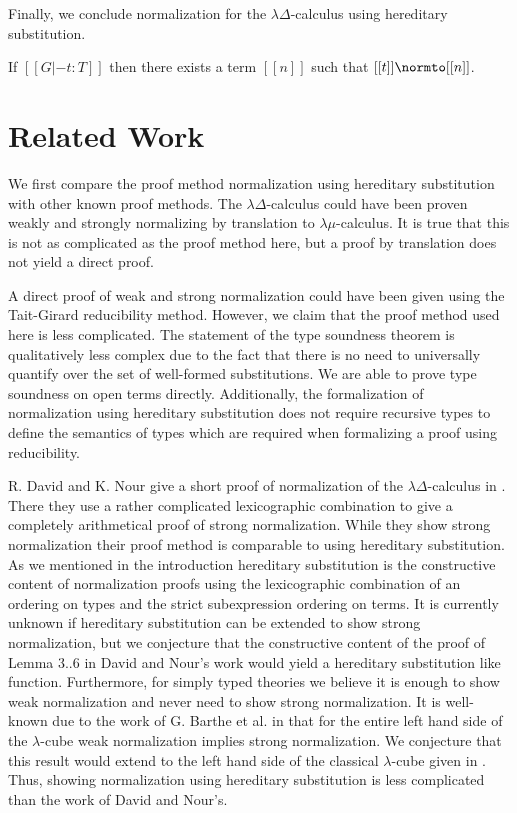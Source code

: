 \noindent
Finally, we conclude normalization for the $\lambda\Delta$-calculus using hereditary substitution.
\begin{corollary}[Normalization]
  \label{corollary:normalization}
  If $[[G |- t : T]]$ then there exists a term $[[n]]$ such that $[[t]] \normto [[n]]$.
\end{corollary}

\section{Related Work}
\label{sec:related_work}
We first compare the proof method normalization using hereditary
substitution with other known proof methods.  The
$\lambda\Delta$-calculus could have been proven weakly and strongly
normalizing by translation to $\lambda\mu$-calculus.  It is true that
this is not as complicated as the proof method here, but a proof by
translation does not yield a direct proof.  

A direct proof of weak and strong normalization could have been given
using the Tait-Girard reducibility method.  However, we claim that the
proof method used here is less complicated.  The statement of the type
soundness theorem is qualitatively less complex due to the fact that
there is no need to universally quantify over the set of well-formed
substitutions.  We are able to prove type soundness on open terms
directly.  Additionally, the formalization of normalization using
hereditary substitution does not require recursive types to define the
semantics of types which are required when formalizing a proof using
reducibility.  

R. David and K. Nour give a short proof of normalization of the
$\lambda\Delta$-calculus in \cite{David:2003}.  There they use a
rather complicated lexicographic combination to give a completely
arithmetical proof of strong normalization.  While they show strong
normalization their proof method is comparable to using hereditary
substitution.  As we mentioned in the introduction hereditary
substitution is the constructive content of normalization proofs using
the lexicographic combination of an ordering on types and the strict
subexpression ordering on terms.  It is currently unknown if
hereditary substitution can be extended to show strong normalization,
but we conjecture that the constructive content of the proof of Lemma
3..6 in David and Nour's work would yield a hereditary substitution
like function.  Furthermore, for simply typed theories we believe it
is enough to show weak normalization and never need to show strong
normalization.  It is well-known due to the work of G. Barthe et
al. in \cite{Barthe:2001} that for the entire left hand side of the
$\lambda$-cube weak normalization implies strong normalization.  We
conjecture that this result would extend to the left hand side of the
classical $\lambda$-cube given in \cite{Barthe:1997}.  Thus, showing
normalization using hereditary substitution is less complicated than
the work of David and Nour's.

